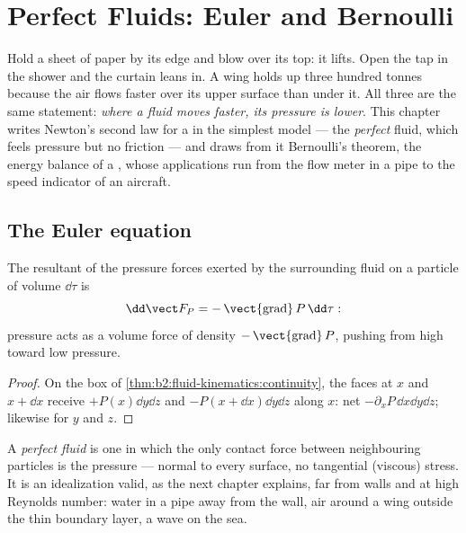 \chapter{Perfect Fluids: Euler and Bernoulli}\label{ch:b2:euler-bernoulli}

Hold a sheet of paper by its edge and blow over its top: it lifts. Open
the tap in the shower and the curtain leans in. A wing holds up three
hundred tonnes because the air flows faster over its upper surface
than under it. All three are the same statement: \emph{where a fluid
moves faster, its pressure is lower}. This chapter writes Newton's
second law for a  in the simplest model --- the
\emph{perfect} fluid, which feels pressure but no friction --- and
draws from it Bernoulli's theorem, the energy balance of a ,
whose applications run from the flow meter in a pipe to the speed
indicator of an aircraft.

\section{The Euler equation}

\begin{proposition}\label{prop:b2:euler-bernoulli:pressure}
The resultant of the pressure forces exerted by the surrounding fluid
on a particle of volume $\dd\tau$ is
\[
\dd\vect F_P = -\operatorname{\vect{grad}}P\,\dd\tau :
\]
pressure acts as a volume force of density $-\operatorname{\vect{grad}}P$,
pushing from high toward low pressure.
\end{proposition}

\begin{proof}
On the box of \cref{thm:b2:fluid-kinematics:continuity}, the faces at
$x$ and $x + \dd x$ receive $+P(x)\dd y\dd z$ and $-P(x + \dd x)\dd y\dd z$
along $x$: net $-\partial_xP\,\dd x\dd y\dd z$; likewise for $y$ and $z$.
\end{proof}

\begin{definition}\label{def:b2:euler-bernoulli:perfect}
A \emph{perfect fluid} is one in which the only contact force between
neighbouring particles is the pressure --- normal to every surface, no
tangential (viscous) stress. It is an idealization valid, as the next
chapter explains, far from walls and at high Reynolds number: water in
a pipe away from the wall, air around a wing outside the thin boundary
layer, a wave on the sea.
\end{definition}

